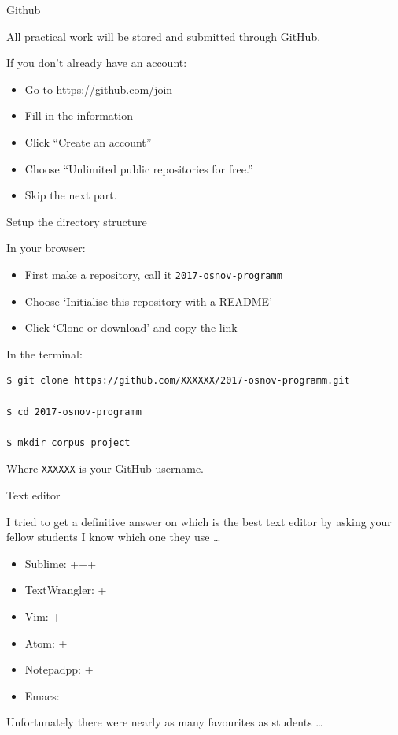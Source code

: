 \documentclass[10pt, compress]{beamer}
\begin{document}
\begin{frame}{Github}

All practical work will be stored and submitted through GitHub.

If you don't already have an account:
\begin{itemize}
 \item Go to \url{https://github.com/join}
 \item Fill in the information
 \item Click ``Create an account''
 \item Choose ``Unlimited public repositories for free.''
 \item Skip the next part.
\end{itemize}

\end{frame}

\begin{frame}[fragile]{Setup the directory structure}

In your browser:
\begin{itemize}
  \item First make a repository, call it {\tt 2017-osnov-programm}
  \item Choose `Initialise this repository with a README'
  \item Click `Clone or download' and copy the link
\end{itemize}

In the terminal:

\begin{verbatim}
$ git clone https://github.com/XXXXXX/2017-osnov-programm.git

$ cd 2017-osnov-programm

$ mkdir corpus project
\end{verbatim}

Where {\tt XXXXXX} is your GitHub username.



\end{frame}

\begin{frame}{Text editor}

I tried to get a definitive answer on which is the best text editor by asking
your fellow students I know which one they use \ldots

\begin{itemize}
\item Sublime: +++
\item TextWrangler: +
\item Vim: +
\item Atom: +
\item Notepadpp: +
\item Emacs:
\end{itemize}

Unfortunately there were nearly as many favourites as students \ldots


\end{frame}
\end{document}

